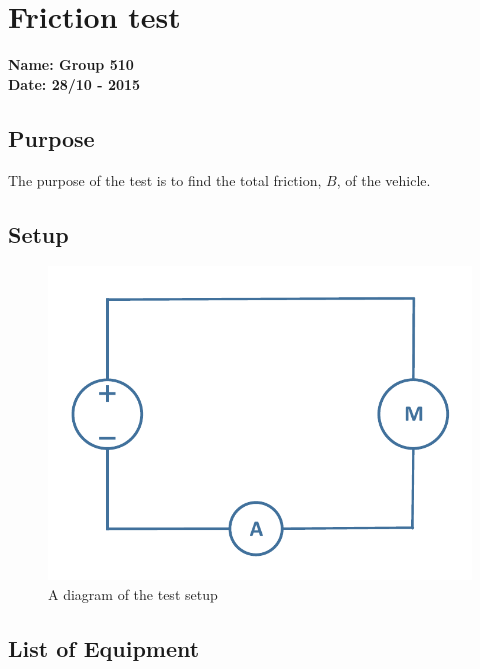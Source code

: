 \pagebreak
\section{Friction test} %
\textbf{Name: Group 510}\\
\textbf{Date: 28/10 - 2015}

\subsection{Purpose}
The purpose of the test is to find the total friction, $B$, of the vehicle.

\subsection{Setup}
\begin{figure}[H]
  \centering
	\includegraphics[scale=0.5]{figures/FrictionTest.pdf}
	\caption{A diagram of the test setup}
\end{figure}

\subsection{List of Equipment}

